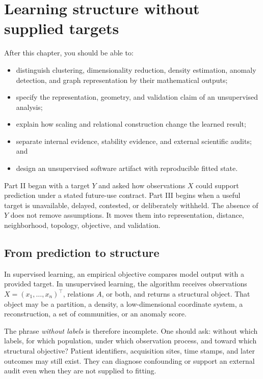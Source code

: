 \chapter{Learning structure without supplied targets}
\label{ch:unsupervised-learning}

\begin{learningobjectives}
After this chapter, you should be able to:
\begin{itemize}
  \item distinguish clustering, dimensionality reduction, density estimation,
  anomaly detection, and graph representation by their mathematical outputs;
  \item specify the representation, geometry, and validation claim of an
  unsupervised analysis;
  \item explain how scaling and relational construction change the learned result;
  \item separate internal evidence, stability evidence, and external scientific audits; and
  \item design an unsupervised software artifact with reproducible fitted state.
\end{itemize}
\end{learningobjectives}

\begin{chapterconnection}
Part II began with a target $Y$ and asked how observations $X$ could support
prediction under a stated future-use contract. Part III begins when a useful
target is unavailable, delayed, contested, or deliberately withheld. The
absence of $Y$ does not remove assumptions. It moves them into representation,
distance, neighborhood, topology, objective, and validation.
\end{chapterconnection}

\section{From prediction to structure}

In supervised learning, an empirical objective compares model output with a
provided target. In unsupervised learning, the algorithm receives observations
$X=(x_1,\ldots,x_n)^\top$, relations $A$, or both, and returns a structural
object. That object may be a partition, a density, a low-dimensional coordinate
system, a reconstruction, a set of communities, or an anomaly score.

The phrase \emph{without labels} is therefore incomplete. One should ask:
without which labels, for which population, under which observation process,
and toward which structural objective? Patient identifiers, acquisition sites,
time stamps, and later outcomes may still exist. They can diagnose confounding
or support an external audit even when they are not supplied to fitting.


